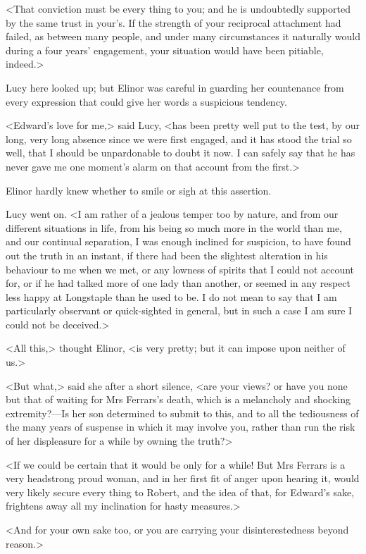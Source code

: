 <That conviction must be every thing to you; and he is undoubtedly supported by the same trust in your's. If the strength of your reciprocal attachment had failed, as between many people, and under many circumstances it naturally would during a four years' engagement, your situation would have been pitiable, indeed.>

Lucy here looked up; but Elinor was careful in guarding her countenance from every expression that could give her words a suspicious tendency.

<Edward's love for me,> said Lucy, <has been pretty well put to the test, by our long, very long absence since we were first engaged, and it has stood the trial so well, that I should be unpardonable to doubt it now. I can safely say that he has never gave me one moment's alarm on that account from the first.>

Elinor hardly knew whether to smile or sigh at this assertion.

Lucy went on. <I am rather of a jealous temper too by nature, and from our different situations in life, from his being so much more in the world than me, and our continual separation, I was enough inclined for suspicion, to have found out the truth in an instant, if there had been the slightest alteration in his behaviour to me when we met, or any lowness of spirits that I could not account for, or if he had talked more of one lady than another, or seemed in any respect less happy at Longstaple than he used to be. I do not mean to say that I am particularly observant or quick-sighted in general, but in such a case I am sure I could not be deceived.>

<All this,> thought Elinor, <is very pretty; but it can impose upon neither of us.>

<But what,> said she after a short silence, <are your views? or have you none but that of waiting for Mrs Ferrars's death, which is a melancholy and shocking extremity?—Is her son determined to submit to this, and to all the tediousness of the many years of suspense in which it may involve you, rather than run the risk of her displeasure for a while by owning the truth?>

<If we could be certain that it would be only for a while! But Mrs Ferrars is a very headstrong proud woman, and in her first fit of anger upon hearing it, would very likely secure every thing to Robert, and the idea of that, for Edward's sake, frightens away all my inclination for hasty measures.>

<And for your own sake too, or you are carrying your disinterestedness beyond reason.>

